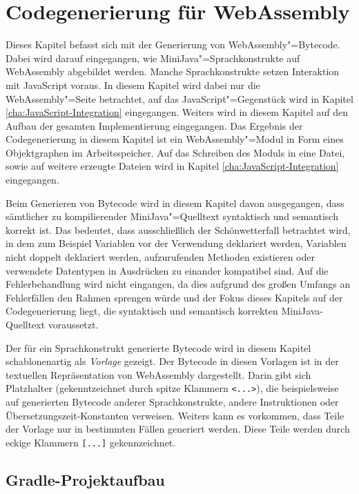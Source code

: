 \chapter{Codegenerierung für WebAssembly}
\label{cha:Codegenerierung-für-WebAssembly}

Dieses Kapitel befasst sich mit der Generierung von WebAssembly"=Bytecode. Dabei wird darauf eingegangen, wie MiniJava"=Sprachkonstrukte auf WebAssembly abgebildet werden. Manche Sprachkonstrukte setzen Interaktion mit JavaScript voraus. In diesem Kapitel wird dabei nur die WebAssembly"=Seite betrachtet, auf das JavaScript"=Gegenstück wird in Kapitel \ref{cha:JavaScript-Integration} eingegangen. Weiters wird in diesem Kapitel auf den Aufbau der gesamten Implementierung eingegangen. Das Ergebnis der Codegenerierung in diesem Kapitel ist ein WebAssembly"=Modul in Form eines Objektgraphen im Arbeitsspeicher. Auf das Schreiben des Moduls in eine Datei, sowie auf weitere erzeugte Dateien wird in Kapitel \ref{cha:JavaScript-Integration} eingegangen.

Beim Generieren von Bytecode wird in diesem Kapitel davon ausgegangen, dass sämtlicher zu kompilierender MiniJava"=Quelltext syntaktisch und semantisch korrekt ist. Das bedeutet, dass ausschließlich der Schönwetterfall betrachtet wird, in dem zum Beispiel Variablen vor der Verwendung deklariert werden, Variablen nicht doppelt deklariert werden, aufzurufenden Methoden existieren oder verwendete Datentypen in Ausdrücken zu einander kompatibel sind. Auf die Fehlerbehandlung wird nicht eingangen, da dies aufgrund des großen Umfangs an Fehlerfällen den Rahmen sprengen würde und der Fokus dieses Kapitels auf der Codegenerierung liegt, die syntaktisch und semantisch korrekten MiniJava-Quelltext voraussetzt.

Der für ein Sprachkonstrukt generierte Bytecode wird in diesem Kapitel schablonenartig als \emph{Vorlage} gezeigt. Der Bytecode in diesen Vorlagen ist in der textuellen Repräsentation von WebAssembly dargestellt. Darin gibt sich Platzhalter (gekenntzeichnet durch spitze Klammern \lstinline{<...>}), die beispielsweise auf generierten Bytecode anderer Sprachkonstrukte, andere Instruktionen oder Übersetzungszeit-Konstanten verweisen. Weiters kann es vorkommen, dass Teile der Vorlage nur in bestimmten Fällen generiert werden. Diese Teile werden durch eckige Klammern \lstinline{[...]} gekennzeichnet.

\pagebreak
\section{Gradle-Projektaufbau}

